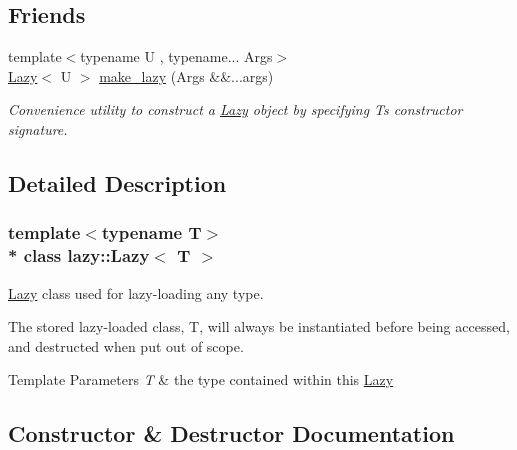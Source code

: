 \subsection*{Friends}
\begin{DoxyCompactItemize}
\item 
{\footnotesize template$<$typename U , typename... Args$>$ }\\\hyperlink{classlazy_1_1_lazy}{Lazy}$<$ U $>$ \hyperlink{classlazy_1_1_lazy_a5360133703514062537c5e6362482ea3}{make\+\_\+lazy} (Args \&\&...args)
\begin{DoxyCompactList}\small\item\em Convenience utility to construct a {\ttfamily \hyperlink{classlazy_1_1_lazy}{Lazy}} object by specifying {\ttfamily T\textquotesingle{}s} constructor signature. \end{DoxyCompactList}\end{DoxyCompactItemize}


\subsection{Detailed Description}
\subsubsection*{template$<$typename T$>$\\*
class lazy\+::\+Lazy$<$ T $>$}

\hyperlink{classlazy_1_1_lazy}{Lazy} class used for lazy-\/loading any type. 

The stored lazy-\/loaded class, {\ttfamily T}, will always be instantiated before being accessed, and destructed when put out of scope.


\begin{DoxyTemplParams}{Template Parameters}
{\em T} & the type contained within this {\ttfamily \hyperlink{classlazy_1_1_lazy}{Lazy}} \\
\hline
\end{DoxyTemplParams}


\subsection{Constructor \& Destructor Documentation}
